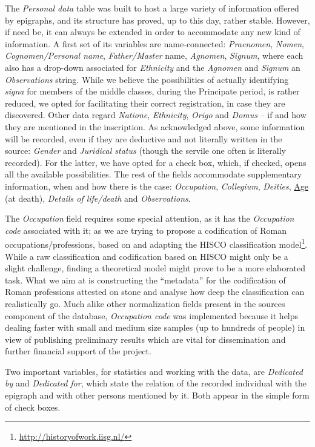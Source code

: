 \documentclass[amsthm,ebook]{saparticle}
\begin{document}
The \emph{Personal data} table was built to host a large variety of information offered by epigraphs, and its structure has
proved, up to this day, rather stable. However, if need be, it can always be extended in order to accommodate any new
kind of information. A first set of its variables are name-connected: \emph{Praenomen}, \emph{Nomen}, \emph{Cognomen/Personal name},
\emph{Father/Master} name, \emph{Agnomen}, \emph{Signum}, where each also has a drop-down associated for \emph{Ethnicity} and the \emph{Agnomen} and
\emph{Signum} an \emph{Observations} string. While we believe the possibilities of actually identifying \emph{signa} for members of the
middle classes, during the Principate period, is rather reduced, we opted for facilitating their correct registration,
in case they are discovered. Other data regard \emph{Natione}, \emph{Ethnicity}, \emph{Origo} and \emph{Domus} – if and how they are mentioned in
the inscription. As acknowledged above, some information will be recorded, even if they are deductive and not literally
written in the source: \emph{Gender} and \emph{Juridical status} (though the servile one often is literally recorded). For the
latter, we have opted for a check box, which, if checked, opens all the available possibilities. The rest of the fields
accommodate supplementary information, when and how there is the case: \emph{Occupation}, \emph{Collegium}, \emph{Deities}, \underline{Age} (at death),
\emph{Details of life/death} and \emph{Observations}. 

The \emph{Occupation} field requires some special attention, as it has the \emph{Occupation code} associated with it; as we are trying
to propose a codification of Roman occupations/professions, based on and adapting the HISCO classification
model\footnote{\url{http://historyofwork.iisg.nl/} }. While a raw classification and codification based on HISCO might only
be a slight challenge, finding a theoretical model might prove to be a more elaborated task. What we aim at is
constructing the ``metadata'' for the codification of Roman professions attested on stone and analyse how deep the
classification can realistically go. Much alike other normalization fields present in the sources component of the
database, \emph{Occupation code} was implemented because it helps dealing faster with small and medium size samples (up to
hundreds of people) in view of publishing preliminary results which are vital for dissemination and further financial
support of the project. 

Two important variables, for statistics and working with the data, are \emph{Dedicated by} and \emph{Dedicated for}, which state the
relation of the recorded individual with the epigraph and with other persons mentioned by it. Both appear in the simple
form of check boxes. 
\end{document}
